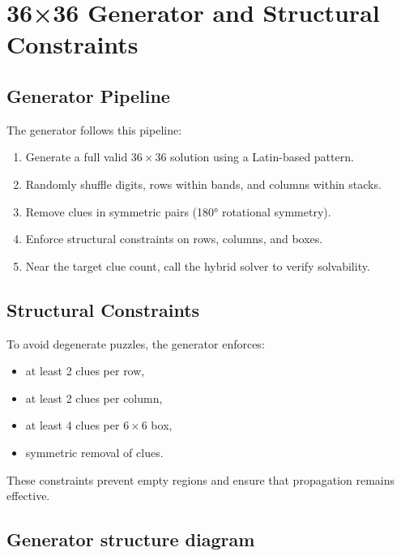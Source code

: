 \documentclass[11pt]{article}
\begin{document}
\section{36×36 Generator and Structural Constraints}

\subsection{Generator Pipeline}
The generator follows this pipeline:
\begin{enumerate}
    \item Generate a full valid $36 \times 36$ solution using a Latin-based pattern.
    \item Randomly shuffle digits, rows within bands, and columns within stacks.
    \item Remove clues in symmetric pairs (180° rotational symmetry).
    \item Enforce structural constraints on rows, columns, and boxes.
    \item Near the target clue count, call the hybrid solver to verify solvability.
\end{enumerate}

\subsection{Structural Constraints}
To avoid degenerate puzzles, the generator enforces:
\begin{itemize}
    \item at least 2 clues per row,
    \item at least 2 clues per column,
    \item at least 4 clues per $6 \times 6$ box,
    \item symmetric removal of clues.
\end{itemize}
These constraints prevent empty regions and ensure that propagation remains effective.

\subsection{Generator structure diagram}
\end{document}
